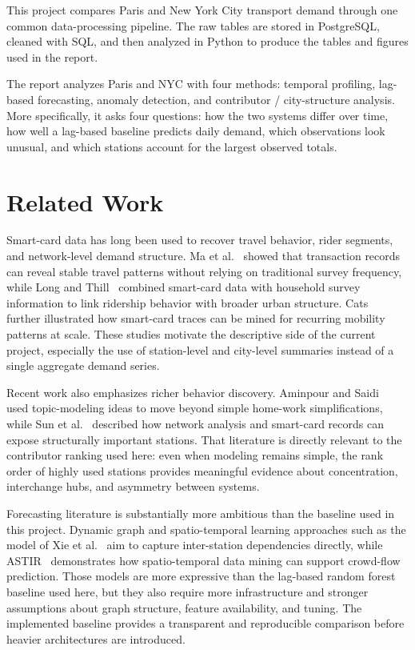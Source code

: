 \documentclass[10pt,twocolumn,a4paper]{article}
\begin{document}
This project compares Paris and New York City transport demand through one
common data-processing pipeline. The raw tables are stored in PostgreSQL,
cleaned with SQL, and then analyzed in Python to produce the tables and
figures used in the report.

The report analyzes Paris and NYC with four methods: temporal profiling,
lag-based forecasting, anomaly detection, and contributor / city-structure
analysis. More specifically, it asks four questions: how the two systems differ
over time, how well a lag-based baseline predicts daily demand, which
observations look unusual, and which stations account for the largest observed
totals.


\section{Related Work}

Smart-card data has long been used to recover travel behavior, rider segments,
and network-level demand structure. Ma et al.~\cite{ma2013smartcard} showed
that transaction records can reveal stable travel patterns without relying on
traditional survey frequency, while Long and Thill~\cite{long2015jobs}
combined smart-card data with household survey information to link ridership
behavior with broader urban structure. Cats~\cite{cats2022mobility} further
illustrated how smart-card traces can be mined for recurring mobility patterns
at scale. These studies motivate the descriptive side of the current project,
especially the use of station-level and city-level summaries instead of a
single aggregate demand series.

Recent work also emphasizes richer behavior discovery. Aminpour and
Saidi~\cite{aminpour2024mobility} used topic-modeling ideas to move beyond
simple home-work simplifications, while Sun et al.~\cite{sun2025network}
described how network analysis and smart-card records can expose structurally
important stations. That literature is directly relevant to the contributor
ranking used here: even when modeling remains simple, the rank order of highly
used stations provides meaningful evidence about concentration, interchange
hubs, and asymmetry between systems.

Forecasting literature is substantially more ambitious than the baseline used in
this project. Dynamic graph and spatio-temporal learning approaches such as the
model of Xie et al.~\cite{xie2022graph} aim to capture inter-station
dependencies directly, while ASTIR~\cite{lablack2019astir} demonstrates how
spatio-temporal data mining can support crowd-flow prediction. Those models are
more expressive than the lag-based random forest baseline used here, but they
also require more infrastructure and stronger assumptions about graph
structure, feature availability, and tuning. The implemented baseline provides
a transparent and reproducible comparison before heavier architectures are
introduced.
\end{document}
